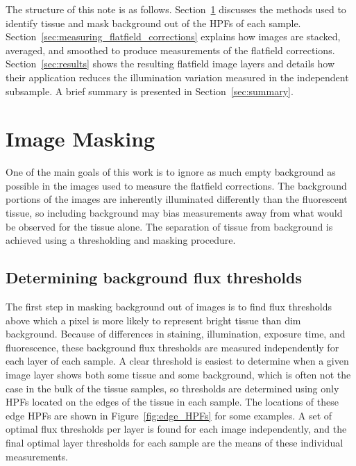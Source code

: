 \documentclass[letterpaper,11pt]{article}
\newcommand{\reffig}[1]{Figure~\ref{#1}}
\newcommand{\refsec}[1]{Section~\ref{#1}}
\begin{document}
The structure of this note is as follows. \refsec{sec:image_masking} discusses the methods used to identify tissue and mask background out of the HPFs of each sample. \refsec{sec:measuring_flatfield_corrections} explains how images are stacked, averaged, and smoothed to produce measurements of the flatfield corrections. \refsec{sec:results} shows the resulting flatfield image layers and details how their application reduces the illumination variation measured in the independent subsample. A brief summary is presented in \refsec{sec:summary}.

\section{Image Masking}
\label{sec:image_masking}

One of the main goals of this work is to ignore as much empty background as possible in the images used to measure the flatfield corrections. The background portions of the images are inherently illuminated differently than the fluorescent tissue, so including background may bias measurements away from what would be observed for the tissue alone. The separation of tissue from background is achieved using a thresholding and masking procedure.

\subsection{Determining background flux thresholds}
\label{ssec:determining_background_flux_thresholds}

The first step in masking background out of images is to find flux thresholds above which a pixel is more likely to represent bright tissue than dim background. Because of differences in staining, illumination, exposure time, and fluorescence, these background flux thresholds are measured independently for each layer of each sample. A clear threshold is easiest to determine when a given image layer shows both some tissue and some background, which is often not the case in the bulk of the tissue samples, so thresholds are determined using only HPFs located on the edges of the tissue in each sample. The locations of these edge HPFs are shown in \reffig{fig:edge_HPFs} for some examples. A set of optimal flux thresholds per layer is found for each image independently, and the final optimal layer thresholds for each sample are the means of these individual measurements.
\end{document}
